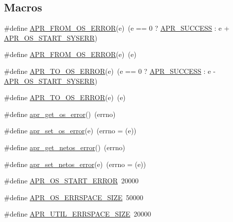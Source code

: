 \subsection*{Macros}
\begin{DoxyCompactItemize}
\item 
\#define \hyperlink{group__apr__errno_ga2096daff578ef301e060b80c7a4525bf}{A\-P\-R\-\_\-\-F\-R\-O\-M\-\_\-\-O\-S\-\_\-\-E\-R\-R\-O\-R}(e)~(e == 0 ? \hyperlink{group__apr__errno_ga9ee311b7bf1c691dc521d721339ee2a6}{A\-P\-R\-\_\-\-S\-U\-C\-C\-E\-S\-S} \-: e + \hyperlink{group__apr__errno_gad70a5cad6862a9abcc254d35e827ac8b}{A\-P\-R\-\_\-\-O\-S\-\_\-\-S\-T\-A\-R\-T\-\_\-\-S\-Y\-S\-E\-R\-R})
\item 
\#define \hyperlink{group__apr__errno_ga2096daff578ef301e060b80c7a4525bf}{A\-P\-R\-\_\-\-F\-R\-O\-M\-\_\-\-O\-S\-\_\-\-E\-R\-R\-O\-R}(e)~(e)
\item 
\#define \hyperlink{group__apr__errno_ga2385cae04b04afbdcb65f1a45c4d8506}{A\-P\-R\-\_\-\-T\-O\-\_\-\-O\-S\-\_\-\-E\-R\-R\-O\-R}(e)~(e == 0 ? \hyperlink{group__apr__errno_ga9ee311b7bf1c691dc521d721339ee2a6}{A\-P\-R\-\_\-\-S\-U\-C\-C\-E\-S\-S} \-: e -\/ \hyperlink{group__apr__errno_gad70a5cad6862a9abcc254d35e827ac8b}{A\-P\-R\-\_\-\-O\-S\-\_\-\-S\-T\-A\-R\-T\-\_\-\-S\-Y\-S\-E\-R\-R})
\item 
\#define \hyperlink{group__apr__errno_ga2385cae04b04afbdcb65f1a45c4d8506}{A\-P\-R\-\_\-\-T\-O\-\_\-\-O\-S\-\_\-\-E\-R\-R\-O\-R}(e)~(e)
\item 
\#define \hyperlink{group__apr__errno_gaa76e122da00af0ce2e8c8d7ff538bdfa}{apr\-\_\-get\-\_\-os\-\_\-error}()~(errno)
\item 
\#define \hyperlink{group__apr__errno_ga9a2d9a03ad314b03a142574be6d7d8a7}{apr\-\_\-set\-\_\-os\-\_\-error}(e)~(errno = (e))
\item 
\#define \hyperlink{group__apr__errno_ga66e54f155b4a80ac7df9118af9bd896a}{apr\-\_\-get\-\_\-netos\-\_\-error}()~(errno)
\item 
\#define \hyperlink{group__apr__errno_gaafc38481621653ece6f592f9c5a9a09b}{apr\-\_\-set\-\_\-netos\-\_\-error}(e)~(errno = (e))
\item 
\#define \hyperlink{group__apr__errno_ga191894048b7bd0cca3cf0bdff1eb695b}{A\-P\-R\-\_\-\-O\-S\-\_\-\-S\-T\-A\-R\-T\-\_\-\-E\-R\-R\-O\-R}~20000
\item 
\#define \hyperlink{group__apr__errno_gadb8d97e6836ccdc57b43b6119a5acccf}{A\-P\-R\-\_\-\-O\-S\-\_\-\-E\-R\-R\-S\-P\-A\-C\-E\-\_\-\-S\-I\-Z\-E}~50000
\item 
\#define \hyperlink{group__apr__errno_gaef5e79630739f24d1512d0d044c2bae7}{A\-P\-R\-\_\-\-U\-T\-I\-L\-\_\-\-E\-R\-R\-S\-P\-A\-C\-E\-\_\-\-S\-I\-Z\-E}~20000

\end{DoxyCompactItemize}
